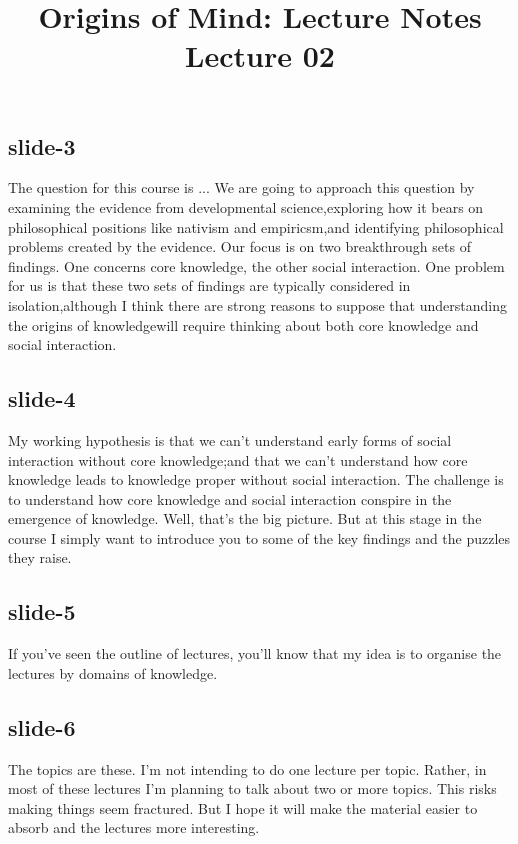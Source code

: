 \documentclass[12pt,\papersize]{extarticle}
\begin{document}
\setlength\footnotesep{1em}









 
 \title {Origins of Mind: Lecture Notes \\ Lecture 02}
 
\maketitle
 
 
\subsection{slide-3}
The question for this course is ...
We are going to approach this question by examining the evidence from developmental science,exploring how it bears on philosophical positions like nativism and empiricsm,and identifying philosophical problems created by the evidence.
Our focus is on two breakthrough sets of findings.
One concerns core knowledge, the other social interaction.
One problem for us is that these two sets of findings are typically considered in isolation,although I think there are strong reasons to suppose that understanding the origins of knowledgewill require thinking about both core knowledge and social interaction.
 
 
\subsection{slide-4}
My working hypothesis is that we can't understand early forms of social interaction without core knowledge;and that we can't understand how core knowledge leads to knowledge proper without social interaction.
The challenge is to understand how core knowledge and social interaction conspire in the emergence of knowledge.
Well, that's the big picture.
But at this stage in the course I simply want to introduce you to some of the key findings and the puzzles they raise.
 
 
\subsection{slide-5}
If you've seen the outline of lectures, you'll know that my idea is to organise the lectures by domains of knowledge.
 
 
\subsection{slide-6}
The topics are these.
I'm not intending to do one lecture per topic.
Rather, in most of these lectures I'm planning to talk about two or more topics.
This risks making things seem fractured.
But I hope it will make the material easier to absorb and the lectures more interesting.
 
\end{document}
